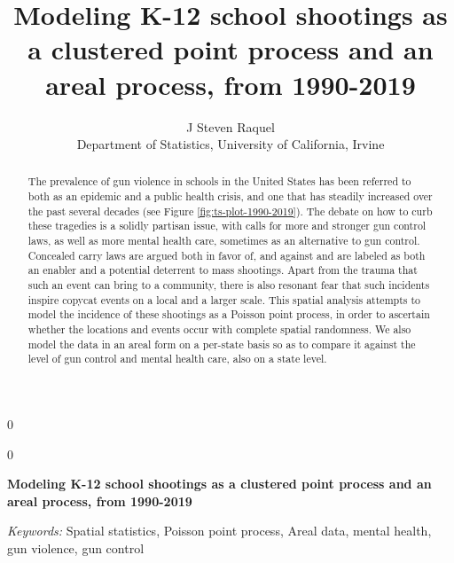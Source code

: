 \documentclass[12pt]{article}
\newcommand{\blind}{0}
\begin{document}
\def\spacingset#1{\renewcommand{\baselinestretch}%
{#1}\small\normalsize} \spacingset{1}



\blind
{
  \title{\bf Modeling K-12 school shootings as a clustered point process and an areal process, from 1990-2019}

  \author{
        J Steven Raquel \\
    Department of Statistics, University of California, Irvine\\
      }
  \maketitle
} \fi

\blind
{
  \bigskip
  \bigskip
  \bigskip
  \begin{center}
    {\LARGE\bf Modeling K-12 school shootings as a clustered point process and an areal process, from 1990-2019}
  \end{center}
  \medskip
} \fi

\bigskip
\begin{abstract}
The prevalence of gun violence in schools in the United States has been referred to both as an epidemic and a public health crisis, and one that has steadily increased over the past several decades (see Figure \ref{fig:ts-plot-1990-2019}). The debate on how to curb these tragedies is a solidly partisan issue, with calls for more and stronger gun control laws, as well as more mental health care, sometimes as an alternative to gun control. Concealed carry laws are argued both in favor of, and against and are labeled as both an enabler and a potential deterrent to mass shootings. Apart from the trauma that such an event can bring to a community, there is also resonant fear that such incidents inspire copycat events on a local and a larger scale. This spatial analysis attempts to model the incidence of these shootings as a Poisson point process, in order to ascertain whether the locations and events occur with complete spatial randomness. We also model the data in an areal form on a per-state basis so as to compare it against the level of gun control and mental health care, also on a state level.
\end{abstract}

\noindent%
{\it Keywords:} Spatial statistics, Poisson point process, Areal data, mental health, gun violence, gun control
\vfill

\newpage
\spacingset{1.45} %
\end{document}
